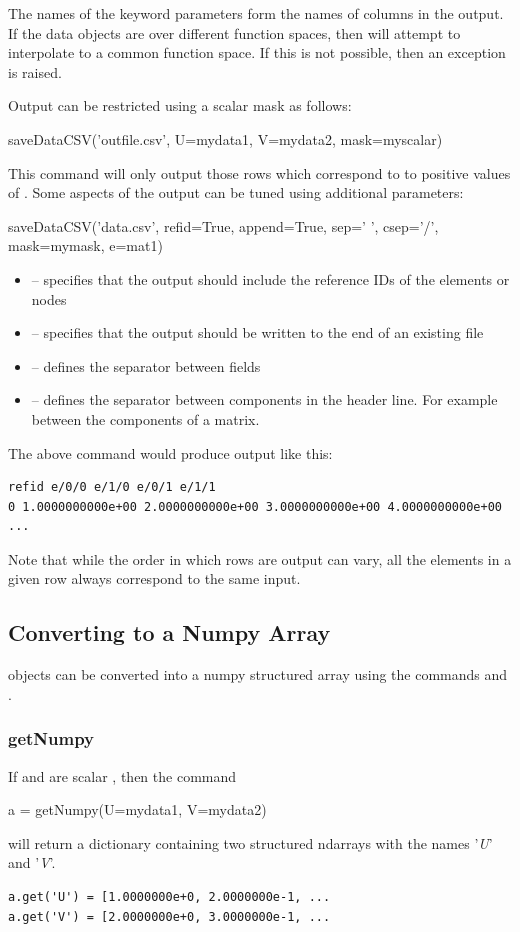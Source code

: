 The names of the keyword parameters form the names of columns in the output.
If the data objects are over different function spaces, then 
will attempt to interpolate to a common function space.
If this is not possible, then an exception is raised.

Output can be restricted using a scalar mask as follows:
\begin{python}
  saveDataCSV('outfile.csv', U=mydata1, V=mydata2, mask=myscalar)
\end{python}
This command will only output those rows which correspond to to positive
values of .
Some aspects of the output can be tuned using additional parameters:
\begin{python}
  saveDataCSV('data.csv', refid=True, append=True, sep=' ', csep='/', mask=mymask, e=mat1)
\end{python}

\begin{itemize}
 \item {} -- specifies that the output should include the reference IDs of the elements or nodes
 \item {} -- specifies that the output should be written to the end of an existing file
 \item {} -- defines the separator between fields
 \item {} -- defines the separator between components in the header
     line. For example between the components of a matrix.
\end{itemize}
%
The above command would produce output like this:
\begin{verbatim}
refid e/0/0 e/1/0 e/0/1 e/1/1
0 1.0000000000e+00 2.0000000000e+00 3.0000000000e+00 4.0000000000e+00
...
\end{verbatim}

Note that while the order in which rows are output can vary, all the elements
in a given row always correspond to the same input.

\subsection{Converting \Data to a Numpy Array}
\label{sec:getnumpy}
\Data objects can be converted into a numpy structured array using the commands  and .
\subsubsection{getNumpy}
If  and  are scalar \Data, then the command
\begin{python}
  a = getNumpy(U=mydata1, V=mydata2)
\end{python}
will return a dictionary containing two structured ndarrays with the names '\emph{U}' and '\emph{V}'.
\begin{verbatim}
a.get('U') = [1.0000000e+0, 2.0000000e-1, ...
a.get('V') = [2.0000000e+0, 3.0000000e-1, ...
\end{verbatim}

